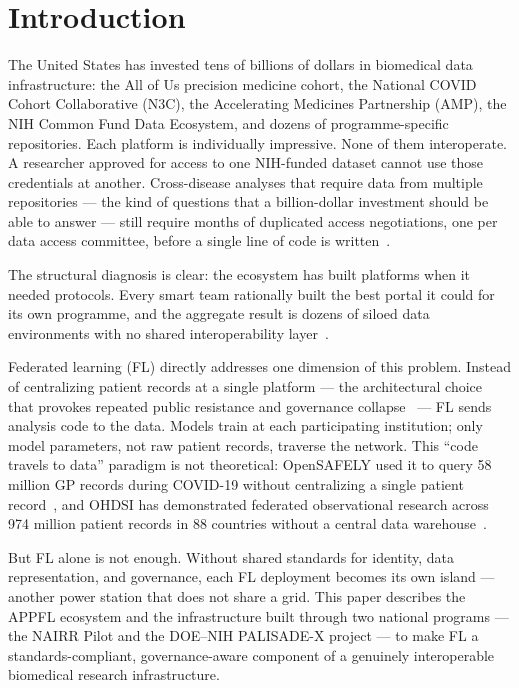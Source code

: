 \documentclass[conference]{IEEEtran}
\begin{document}
\section{Introduction}

The United States has invested tens of billions of dollars in biomedical data infrastructure: the All of Us precision medicine cohort, the National COVID Cohort Collaborative (N3C), the Accelerating Medicines Partnership (AMP), the NIH Common Fund Data Ecosystem, and dozens of programme-specific repositories. Each platform is individually impressive. None of them interoperate. A researcher approved for access to one NIH-funded dataset cannot use those credentials at another. Cross-disease analyses that require data from multiple repositories — the kind of questions that a billion-dollar investment should be able to answer — still require months of duplicated access negotiations, one per data access committee, before a single line of code is written~\cite{taylor2021}.

The structural diagnosis is clear: the ecosystem has built platforms when it needed protocols. Every smart team rationally built the best portal it could for its own programme, and the aggregate result is dozens of siloed data environments with no shared interoperability layer~\cite{varma2026current}.

Federated learning (FL) directly addresses one dimension of this problem. Instead of centralizing patient records at a single platform — the architectural choice that provokes repeated public resistance and governance collapse~\cite{varma2026catalogue} — FL sends analysis code to the data. Models train at each participating institution; only model parameters, not raw patient records, traverse the network. This ``code travels to data'' paradigm is not theoretical: OpenSAFELY used it to query 58 million GP records during COVID-19 without centralizing a single patient record~\cite{opensafely2020}, and OHDSI has demonstrated federated observational research across 974 million patient records in 88 countries without a central data warehouse~\cite{ohdsi}.

But FL alone is not enough. Without shared standards for identity, data representation, and governance, each FL deployment becomes its own island — another power station that does not share a grid. This paper describes the APPFL ecosystem and the infrastructure built through two national programs — the NAIRR Pilot and the DOE--NIH PALISADE-X project — to make FL a standards-compliant, governance-aware component of a genuinely interoperable biomedical research infrastructure.
\end{document}
